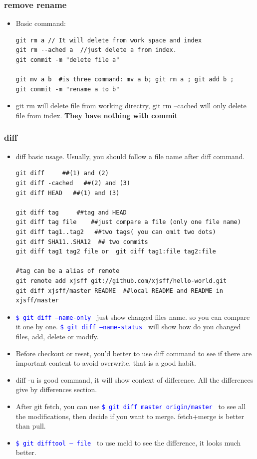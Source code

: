 \documentclass[a4paper,11pt,twoside]{book}
\newcommand{\linuxcommand}[1]{\texttt{\textcolor{blue}{\$ #1 \Pisymbol{psy}{191}}}}
\begin{document}
\subsubsection{remove rename}
\begin{itemize}
		\item Basic command:
\begin{verbatim}
git rm a // It will delete from work space and index
git rm --ached a  //just delete a from index.
git commit -m "delete file a"

git mv a b  #is three command: mv a b; git rm a ; git add b ;
git commit -m "rename a to b"
\end{verbatim}
		\item git rm will delete file from working directry, git rm --cached will only delete file from index. \textbf{They have nothing with commit}
		\end{itemize}

\subsubsection{diff}
\begin{itemize}
\item diff basic usage. Usually, you should follow a file name after diff command. 

\begin{verbatim}
git diff     ##(1) and (2)
git diff -cached   ##(2) and (3)
git diff HEAD   ##(1) and (3)

git diff tag     ##tag and HEAD
git diff tag file    ##just compare a file (only one file name)
git diff tag1..tag2   ##two tags( you can omit two dots)
git diff SHA11..SHA12  ## two commits
git diff tag1 tag2 file or  git diff tag1:file tag2:file

#tag can be a alias of remote
git remote add xjsff git://github.com/xjsff/hello-world.git
git diff xjsff/master README  ##local README and README in xjsff/master
\end{verbatim}
		\item \linuxcommand{git diff --name-only} just show changed files name. so you can compare it one by one.  \linuxcommand{git diff --name-status} will show how do you changed files, add, delete or modify. 

		\item Before checkout or reset, you'd better to use diff command to see if there are important content to avoid overwrite. that is a good habit. 

		\item diff -u is good command, it will show context of difference.  All the differences give by differences section.
   
\item  After git fetch, you can use \linuxcommand{git diff master origin/master} to see all the modifications, then decide if you want to merge. fetch+merge is better than pull.
   
\item \linuxcommand{git difftool -- file} to use meld to see the difference, it looks much better.
\end{itemize}
\end{document}
